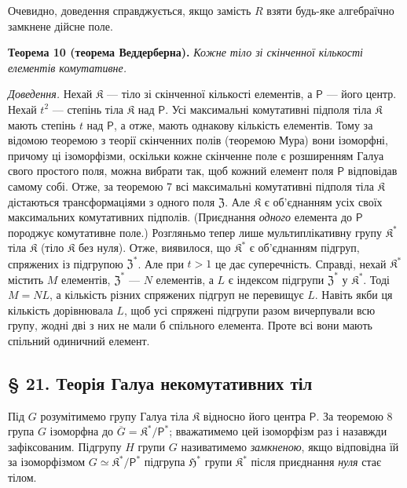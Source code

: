\documentclass[11pt]{article}
\begin{document}
Очевидно, доведення справджується, якщо замість \(R\) взяти будь-яке алгебраїчно замкнене дійсне поле.

\textbf{Теорема 10 (теорема Веддерберна).} \emph{Кожне тіло зі скінченної кількості елементів комутативне.}

\emph{Доведення.} Нехай \(\mathfrak K\) --- тіло зі скінченної кількості елементів, а \(\mathsf P\) --- його центр. Нехай \(t^2\) --- степінь тіла \(\mathfrak K\) над \(\mathsf P\). Усі максимальні комутативні підполя тіла \(\mathfrak K\) мають степінь \(t\) над \(\mathsf P\), а отже, мають однакову кількість елементів. Тому за відомою теоремою з теорії скінченних полів (теоремою Мура) вони ізоморфні, причому ці ізоморфізми, оскільки кожне скінченне поле є розширенням Галуа свого простого поля, можна вибрати так, щоб кожний елемент поля \(\mathsf P\) відповідав самому собі. Отже, за теоремою 7 всі максимальні комутативні підполя тіла \(\mathfrak K\) дістаються трансформаціями з одного поля \(\mathfrak Z\). Але \(\mathfrak K\) є об'єднанням усіх своїх максимальних комутативних підполів. (Приєднання \emph{одного} елемента до \(\mathsf P\) породжує комутативне поле.) Розгляньмо тепер лише мультиплікативну групу \(\mathfrak K^*\) тіла \(\mathfrak K\) (тіло \(\mathfrak K\) без нуля). Отже, виявилося, що \(\mathfrak K^*\) є об'єднанням підгруп, спряжених із підгрупою \(\mathfrak Z^*\). Але при \(t>1\) це дає суперечність. Справді, нехай \(\mathfrak K^*\) містить \(M\) елементів, \(\mathfrak Z^*\) --- \(N\) елементів, а \(L\) є індексом підгрупи \(\mathfrak Z^*\) у \(\mathfrak K^*\). Тоді \(M=NL\), а кількість різних спряжених підгруп не перевищує \(L\). Навіть якби ця кількість дорівнювала \(L\), щоб усі спряжені підгрупи разом вичерпували всю групу, жодні дві з них не мали б спільного елемента. Проте всі вони мають спільний одиничний елемент.

\subsection*{§ 21. Теорія Галуа некомутативних тіл}\label{die-galoissche-theorie-der-nichtkommutativen-koerper}

Під \(G\) розумітимемо групу Галуа тіла \(\mathfrak K\) відносно його центра \(\mathsf P\). За теоремою 8 група \(G\) ізоморфна до \(\overline G=\mathfrak K^*/\mathsf P^*\); вважатимемо цей ізоморфізм раз і назавжди зафіксованим. Підгрупу \(H\) групи \(G\) називатимемо \emph{замкненою}, якщо відповідна їй за ізоморфізмом \(G\simeq\mathfrak K^*/\mathsf P^*\) підгрупа \(\mathfrak H^*\) групи \(\mathfrak K^*\) після приєднання \emph{нуля} стає тілом.
\end{document}
